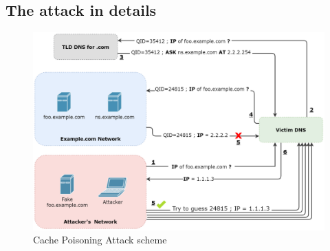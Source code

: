 \documentclass[11pt,a4paper]{article}
\begin{document}
\subsection{The attack in details}
\label{subsec:attack-details}

\begin{figure}[h]
    \centering
    \includegraphics[width=\textwidth]{cache-poisoning-attack.png}
    \caption{Cache Poisoning Attack scheme}
    \label{fig:cache-poisoning-attack}
\end{figure}
\end{document}
